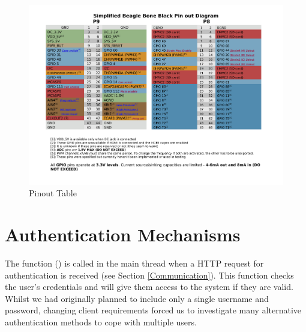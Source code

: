 \begin{figure}[H]
	\centering
	\includegraphics[angle=90,width=1.0\textwidth]{figures/pinout.pdf}
	\caption{Pinout Table} 
	\label{pinout.pdf}
\end{figure}


\section{Authentication Mechanisms}\label{Authentication}

The  function () is called in the main thread when a HTTP request for authentication is received (see Section \ref{Communication}). This function checks the user's credentials and will give them access to the system if they are valid. Whilst we had originally planned to include only a single username and password, changing client requirements forced us to investigate many alternative authentication methods to cope with multiple users.

